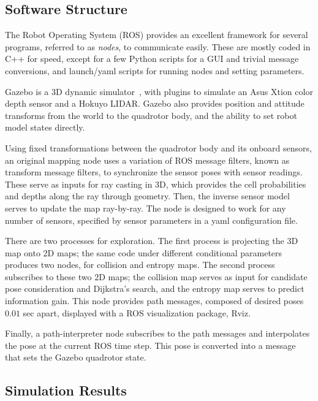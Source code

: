 \subsection{Software Structure}

The Robot Operating System (ROS) provides an excellent framework for several programs, referred to as \emph{nodes}, to communicate easily. These are mostly coded in C++ for speed, except for a few Python scripts for a GUI and trivial message conversions, and launch/yaml scripts for running nodes and setting parameters. 

Gazebo is a 3D dynamic simulator~\cite{KaeHow04}, with plugins to simulate an Asus Xtion color depth sensor and a Hokuyo LIDAR. Gazebo also provides position and attitude transforms from the world to the quadrotor body, and the ability to set robot model states directly. 

Using fixed transformations between the quadrotor body and its onboard sensors, an original mapping node uses a variation of ROS message filters, known as transform message filters, to synchronize the sensor poses with sensor readings. These serve as inputs for ray casting in 3D, which provides the cell probabilities and depths along the ray through geometry. Then, the inverse sensor model serves to update the map ray-by-ray.  The node is designed to work for any number of sensors, specified by sensor parameters in a yaml configuration file.

There are two processes for exploration. The first process is projecting the 3D map onto 2D maps; the same code under different conditional parameters produces two nodes, for collision and entropy maps. The second process subscribes to these two 2D maps; the collision map serves as input for candidate pose consideration and Dijkstra's search, and the entropy map serves to predict information gain. This node provides path messages, composed of desired poses $0.01$ sec apart, displayed with a ROS visualization package, Rviz.

Finally, a path-interpreter node subscribes to the path messages and interpolates the pose at the current ROS time step. This pose is converted into a message that sets the Gazebo quadrotor state.



\subsection{Simulation Results}


